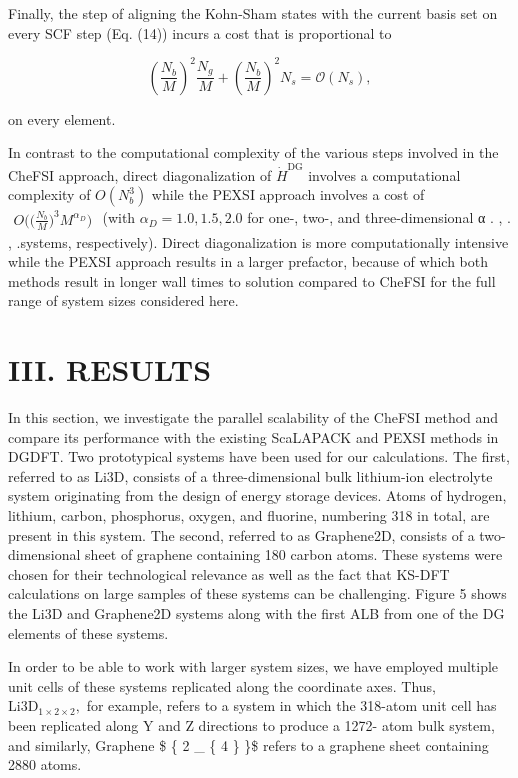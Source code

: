 \documentclass[
  10
]{article}
\begin{document}
Finally, the step of aligning the Kohn-Sham states with the current
basis set on every SCF step (Eq. (14)) incurs a cost that is
proportional to

\[
\left(\frac {N _ {b}}{M}\right) ^ {2} \frac {N _ {g}}{M} + \left(\frac {N _ {b}}{M}\right) ^ {2} N _ {s} = \mathcal {O} (N _ {s}), \tag {17}
\]

on every element.

In contrast to the computational complexity of the various steps
involved in the CheFSI approach, direct diagonalization of
\(\dot { H } ^ { \mathrm { D G } }\) involves a computational complexity
of \(O ( N _ { b } ^ { 3 } )\) while the PEXSI approach involves a cost
of
\(\begin{array} { r } { O \Big ( \big ( \frac { N _ { b } } { M } \big ) ^ { 3 } M ^ { \alpha _ { D } } \Big ) } \end{array}\)
(with \(\alpha _ { D } = 1 . 0 , 1 . 5 , 2 . 0\) for one-, two-, and
three-dimensional α . , . , .systems, respectively). Direct
diagonalization is more computationally intensive while the PEXSI
approach results in a larger prefactor, because of which both methods
result in longer wall times to solution compared to CheFSI for the full
range of system sizes considered here.

\section{III. RESULTS}\label{iii.-results}

In this section, we investigate the parallel scalability of the CheFSI
method and compare its performance with the existing ScaLAPACK and PEXSI
methods in DGDFT. Two prototypical systems have been used for our
calculations. The first, referred to as Li3D, consists of a
three-dimensional bulk lithium-ion electrolyte system originating from
the design of energy storage devices. Atoms of hydrogen, lithium,
carbon, phosphorus, oxygen, and fluorine, numbering 318 in total, are
present in this system. The second, referred to as Graphene2D, consists
of a two-dimensional sheet of graphene containing 180 carbon atoms.
These systems were chosen for their technological relevance as well as
the fact that KS-DFT calculations on large samples of these systems can
be challenging. Figure 5 shows the Li3D and Graphene2D systems along
with the first ALB from one of the DG elements of these systems.

In order to be able to work with larger system sizes, we have employed
multiple unit cells of these systems replicated along the coordinate
axes. Thus,
\(\mathrm { L i } 3 \mathrm { D } _ { 1 \times 2 \times 2 } ,\) for
example, refers to a system in which the 318-atom unit cell has been
replicated along Y and Z directions to produce a 1272- atom bulk system,
and similarly, Graphene \$ \{ 2  \_ \{ 4  \} \}\$
refers to a graphene sheet containing 2880 atoms.
\end{document}
